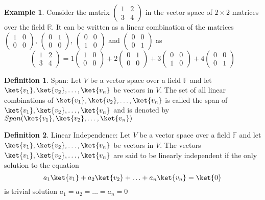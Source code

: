 \documentclass[12pt, oneside]{book}
\theoremstyle{definition}
\newtheorem{definition}{Definition}[section]
\theoremstyle{definition}
\newtheorem{example}{Example}[section]
\theoremstyle{remark}
\begin{document}
\begin{example}
    Consider the matrix $\begin{pmatrix} 1 & 2 \\ 3 & 4 \end{pmatrix}$ in the vector space of $2\times 2$ matrices over the field $\mathbb{R}$. It can be written as a linear combination of the matrices
    $\begin{pmatrix} 1 & 0 \\ 0 & 0 \end{pmatrix}$, $\begin{pmatrix} 0 & 1 \\ 0 & 0 \end{pmatrix}$, $\begin{pmatrix} 0 & 0 \\ 1 & 0 \end{pmatrix}$ and $\begin{pmatrix} 0 & 0 \\ 0 & 1 \end{pmatrix}$ as
    \[
        \begin{pmatrix} 1 & 2 \\ 3 & 4 \end{pmatrix}=1\begin{pmatrix} 1 & 0 \\ 0 & 0 \end{pmatrix}+2\begin{pmatrix} 0 & 1 \\ 0 & 0 \end{pmatrix}+3\begin{pmatrix} 0 & 0 \\ 1 & 0 \end{pmatrix}+4\begin{pmatrix} 0 & 0 \\ 0 & 1 \end{pmatrix}
    \]
\end{example}

\begin{definition}
    Span: Let $V$ be a vector space over a field $\mathbb{F}$ and 
    let $\ket{v_1},\ket{v_2},\ldots,\ket{v_n}$ be vectors in $V$. 
    The set of all linear combinations of $\ket{v_1},\ket{v_2},\ldots,\ket{v_n}$ 
    is called the span of $\ket{v_1},\ket{v_2},\ldots,\ket{v_n}$ 
    and is denoted by $Span(\ket{v_1},\ket{v_2},\ldots,\ket{v_n})$
\end{definition}

\begin{definition}
    Linear Independence: Let $V$ be a vector space over a field $\mathbb{F}$ and let $\ket{v_1},\ket{v_2},\ldots,\ket{v_n}$ be vectors in $V$. The vectors $\ket{v_1},\ket{v_2},\ldots,\ket{v_n}$ are said to be linearly independent if the only solution to the equation
    \begin{equation}
        a_1\ket{v_1}+a_2\ket{v_2}+\ldots+a_n\ket{v_n}=\ket{0}
        \label{eq:Linear Independence}
    \end{equation}
    is trivial solution $a_1=a_2=\ldots=a_n=0$
\end{definition}
\end{document}
